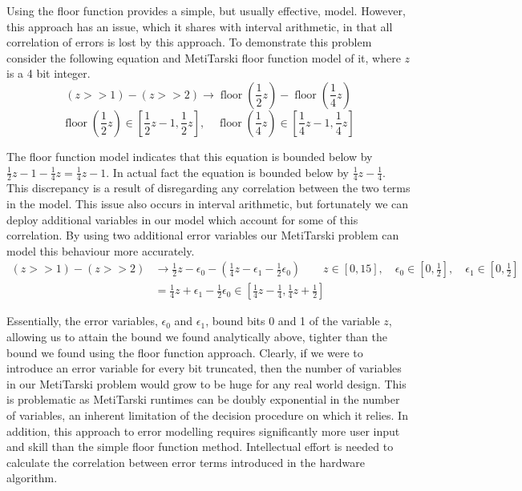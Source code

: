 \documentclass{fac}
\newcommand{\floor}{\mathop{\textrm{floor}}\nolimits}
\begin{document}
Using the floor function provides a simple, but usually effective, model. However, this approach has an issue, which it shares with interval arithmetic, in that all correlation of errors is lost by this approach. To demonstrate this problem consider the following equation and MetiTarski floor function model of it, where $z$ is a 4 bit integer.
\[
(z>>1) - (z>>2) \rightarrow  \floor(\frac{1}{2}z) - \floor(\frac{1}{4}z)
\]
\[
\floor(\frac{1}{2}z) \in [\frac{1}{2}z-1, \frac{1}{2}z], \quad \floor(\frac{1}{4}z) \in [\frac{1}{4}z-1,\frac{1}{4}z]
\]

The floor function model indicates that this equation is bounded below by $\frac{1}{2}z - 1 - \frac{1}{4}z = \frac{1}{4}z - 1$. In actual fact the equation is bounded below by $\frac{1}{4}z - \frac{1}{4}$. This discrepancy is a result of disregarding any correlation between the two terms in the model. This issue also occurs in interval arithmetic, but fortunately we can deploy additional variables in our model which account for some of this correlation. By using two additional error variables our MetiTarski problem can model this behaviour more accurately.
\begin{align*}
(z>>1) - (z>>2) &\rightarrow \frac{1}{2}z - \epsilon_0 - (\frac{1}{4}z - \epsilon_1 - \frac{1}{2}\epsilon_0) \qquad z \in [0,15], \quad \epsilon_0 \in [0,\frac{1}{2}], \quad \epsilon_1 \in [0,\frac{1}{2}] \\   
                &=           \frac{1}{4}z + \epsilon_1 - \frac{1}{2}\epsilon_0 \in [\frac{1}{4}z - \frac{1}{4}, \frac{1}{4}z + \frac{1}{2}]
\end{align*}

Essentially, the error variables, $\epsilon_0$ and $\epsilon_1$, bound bits 0 and 1 of the variable $z$, allowing us to attain the bound we found analytically above, tighter than the bound we found using the floor function approach. Clearly, if we were to introduce an error variable for every bit truncated, then the number of variables in our MetiTarski problem would grow to be huge for any real world design. This is problematic as MetiTarski runtimes can be doubly exponential in the number of variables, an inherent limitation of the decision procedure on which it relies. In addition, this approach to error modelling requires significantly more user input and skill than the simple floor function method. Intellectual effort is needed to calculate the correlation between error terms introduced in the hardware algorithm.
\end{document}
